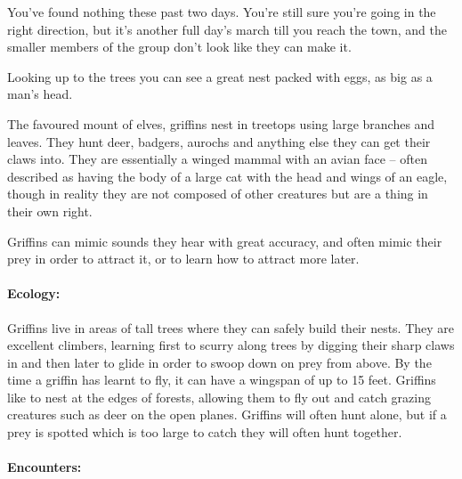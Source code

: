 \begin{multicols}{2}
\begin{itemize}
\end{itemize}


\label{griffin}

\begin{boxtext}

  You've found nothing these past two days.  You're still sure you're going in the right direction, but it's another full day's march till you reach the town, and the smaller members of the group don't look like they can make it.

  Looking up to the trees you can see a great nest packed with eggs, as big as a man's head.

\end{boxtext}

The favoured mount of elves, griffins nest in treetops using large branches and leaves.
They hunt deer, badgers, aurochs and anything else they can get their claws into.
They are essentially a winged mammal with an avian face -- often described as having the body of a large cat with the head and wings of an eagle, though in reality they are not composed of other creatures but are a thing in their own right.

Griffins can mimic sounds they hear with great accuracy, and often mimic their prey in order to attract it, or to learn how to attract more later.


\paragraph{Ecology:} Griffins live in areas of tall trees where they can safely build their nests.
They are excellent climbers, learning first to scurry along trees by digging their sharp claws in and then later to glide in order to swoop down on prey from above.
By the time a griffin has learnt to fly, it can have a wingspan of up to 15 feet.
Griffins like to nest at the edges of forests, allowing them to fly out and catch grazing creatures such as deer on the open planes.
Griffins will often hunt alone, but if a prey is spotted which is too large to catch  they will often hunt together.

\paragraph{Encounters:}

\begin{itemize}


\end{itemize}
\end{multicols}
